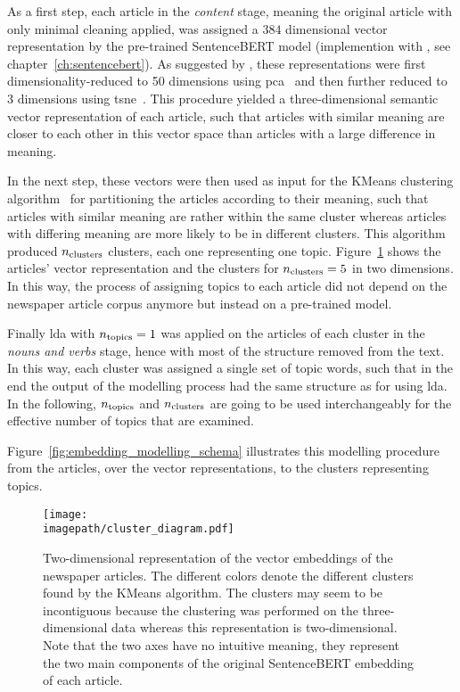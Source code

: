 As a first step, each article in the \textit{content} stage, meaning the original article with only minimal cleaning applied, was assigned a $384$ dimensional vector representation by the pre-trained SentenceBERT model (implemention with \textcite{sbertsentencetransformers_sentencetransformers_2022}, see chapter~\ref{ch:sentencebert}). As suggested by \textcite{black_using_2020}, these representations were first dimensionality-reduced to \SI{50}{} dimensions using \gls{pca}~\autocite{pearson_liii_1901} and then further reduced to \SI{3}{} dimensions using \gls{tsne}~\autocite{maaten_visualizing_2008}. This procedure yielded a three-dimensional semantic vector representation of each article, such that articles with similar meaning are closer to each other in this vector space than articles with a large difference in meaning.

In the next step, these vectors were then used as input for the KMeans clustering algorithm~\autocite{macqueen_methods_1967} for partitioning the articles according to their meaning, such that articles with similar meaning are rather within the same cluster whereas articles with differing meaning are more likely to be in different clusters. This algorithm produced $n_\text{clusters}$ clusters, each one representing one topic. Figure~\ref{fig:clusters} shows the articles' vector representation and the clusters for $n_\text{clusters}=5$ in two dimensions. In this way, the process of assigning topics to each article did not depend on the newspaper article corpus anymore but instead on a pre-trained model.

Finally \gls{lda} with $n_\text{topics}=1$ was applied on the articles of each cluster in the \textit{nouns and verbs} stage, hence with most of the structure removed from the text. In this way, each cluster was assigned a single set of topic words, such that in the end the output of the modelling process had the same structure as for using \gls{lda}. In the following, $n_\text{topics}$ and $n_\text{clusters}$ are going to be used interchangeably for the effective number of topics that are examined.

Figure~\ref{fig:embedding_modelling_schema} illustrates this modelling procedure from the articles, over the vector representations, to the clusters representing topics.

\begin{figure}
    \centering
    \texttt{[image: \\imagepath/cluster\_diagram.pdf]}
    \caption{Two-dimensional representation of the vector embeddings of the newspaper articles. The different colors denote the different clusters found by the KMeans algorithm. The clusters may seem to be incontiguous because the clustering was performed on the three-dimensional data whereas this representation is two-dimensional. Note that the two axes have no intuitive meaning, they represent the two main components of the original SentenceBERT embedding of each article.}\label{fig:clusters}
\end{figure}

